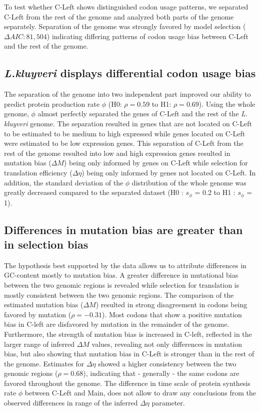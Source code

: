 \documentclass[letter,12pt]{article}
\begin{document}
To test whether C-Left shows distinguished codon usage patterns, we separated C-Left from the rest of the genome and analyzed both parts of the genome separately.
Separation of the genome was strongly favored by model selection ($\Delta AIC: 81,504$) indicating differing patterns of codon usage bias between C-Left and the rest of the genome.

\subsection*{\textit{L.kluyveri} displays differential codon usage bias}
The separation of the genome into two independent part improved our ability to predict protein production rate $\phi$ (H0: $\rho = 0.59$ to H1: $\rho = 0.69$).
Using the whole genome, $\phi$ almost perfectly separated the genes of C-Left and the rest of the \textit{L. kluyveri} genome. 
The separation resulted in genes that are not located on C-Left to be estimated to be medium to high expressed while genes located on C-Left were estimated to be low expression genes. 
This separation of C-Left from the rest of the genome resulted into low and high expression genes resulted in mutation bias ($\Delta M$) being only informed by genes on C-Left while selection for translation efficiency ($\Delta \eta$) being only informed by genes not located on C-Left. 
In addition, the standard deviation of the $\phi$ distribution of the whole genome was greatly decreased compared to the separated dataset (H0 : $s_{\phi}$ = 0.2 to H1 : $s_{\phi}$ = 1).

\subsection*{Differences in mutation bias are greater than in selection bias}
The hypothesis best supported by the data allows us to attribute differences in GC-content mostly to mutation bias. 
A greater difference in mutational bias between the two genomic regions is revealed while selection for translation is mostly consistent between the two genomic regions. 
The comparison of the estimated mutation bias ($\Delta M$) resulted in strong disagreement in codons being favored by mutation ($\rho = -0.31$). 
Most codons that show a positive mutation bias in C-left are disfavored by mutation in the remainder of the genome.  
Furthermore, the strength of mutation bias is increased in C-left, reflected in the larger range of inferred $\Delta M$ values, revealing not only differences in mutation bias, but also showing that mutation bias in C-Left is stronger than in the rest of the genome. 
Estimates for $\Delta \eta$ showed a higher consistency between the two genomic regions ($\rho = 0.68$), indicating that - generally - the same codons are favored throughout the genome. 
The difference in time scale of protein synthesis rate $\phi$ between C-Left and Main, does not allow to draw any conclusions from the observed differences in range of the inferred $\Delta \eta$ parameter.
\end{document}
